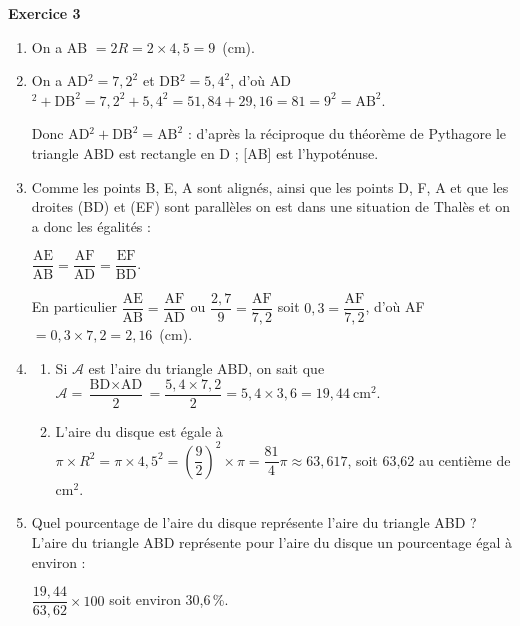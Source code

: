 \documentclass{article}
\begin{document}
\medskip
\textbf{Exercice 3}
\begin{enumerate}
    \item %
    
    On a AB $ = 2R = 2 \times 4,5 = 9$~(cm).
    \item %
    On a AD$^2 = 7,2^2$ et DB$^2 = 5,4^2$, d'où AD$^2 + \text{DB}^2 = 7,2^2 + 5,4^2 = 51,84 + 29,16 = 81 = 9^2 = \text{AB}^2$.
    
    Donc AD$^2 + \text{DB}^2  = \text{AB}^2$ : d'après la réciproque du théorème de Pythagore le triangle ABD est rectangle en D ; [AB] est l'hypoténuse.
    \item %
    Comme les points B, E, A sont alignés, ainsi que les points D, F{}, A et
    que les droites (BD) et (EF) sont parallèles on est dans une situation de Thalès et on a donc les égalités :
    
    $\dfrac{\text{AE}}{\text{AB}} = \dfrac{\text{AF}}{\text{AD}} = \dfrac{\text{EF}}{\text{BD}}$.
    
    En particulier $\dfrac{\text{AE}}{\text{AB}} = \dfrac{\text{AF}}{\text{AD}}$ ou $\dfrac{2,7}{9} = \dfrac{\text{AF}}{7,2}$ soit $0,3 = \dfrac{\text{AF}}{7,2}$, d'où AF $ = 0,3 \times 7,2 = 2,16$~(cm).
    \item 
        \begin{enumerate}
            \item %
            Si $\mathcal{A}$ est l'aire du triangle ABD, on sait que $\mathcal{A} = \dfrac{\text{BD} \times \text{AD}}{2} = \dfrac{5,4 \times 7,2}{2} = 5,4 \times 3,6 = 19,44~\text{cm}^2$.
            \item %
            
    L'aire du disque est égale à $\pi \times R^2 = \pi \times 4,5^2 = \left(\dfrac92 \right)^2 \times \pi  = \dfrac{81}{4}\pi \approx 63,617$, soit 63,62 au centième de cm$^2$.
        \end{enumerate}
        
    \item Quel pourcentage de l'aire du disque représente l'aire du triangle ABD ?
    L'aire du triangle ABD représente pour l'aire du disque un pourcentage égal à environ :
    
    $\dfrac{19,44}{63,62} \times 100$ soit environ 30,6\,\%.
    \end{enumerate}
    
\end{document}
